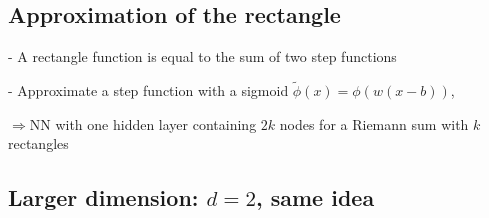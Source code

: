 \subsection*{Approximation of the rectangle}


- A rectangle function is equal to the sum of two step functions

- Approximate a step function with a sigmoid
$
\tilde{\phi}(x)=\phi(w(x-b))
$, 









$\Rightarrow \mathrm{NN}$ with one hidden layer containing $2 k$ nodes for a Riemann sum with $k$ rectangles




\subsection*{Larger dimension: $d=2$, same idea}


